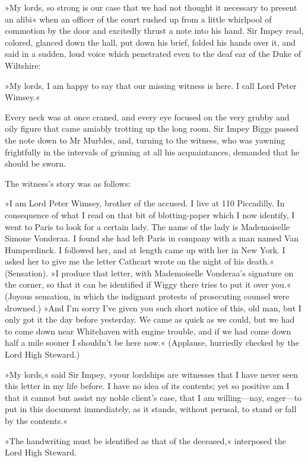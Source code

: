 »My lords, so strong is our case that we had not thought it necessary
to present an alibi\longdash« when an officer of the court rushed up from a
little whirlpool of commotion by the door and excitedly thrust a note
into his hand. Sir Impey read, colored, glanced down the hall, put down
his brief, folded his hands over it, and said in a sudden, loud voice
which penetrated even to the deaf ear of the Duke of Wiltshire:

»My lords, I am happy to say that our missing witness is here. I call
Lord Peter Wimsey.«

Every neck was at once craned, and every eye focused on the very grubby
and oily figure that came amiably trotting up the long room. Sir Impey
Biggs passed the note down to Mr Murbles, and, turning to the witness,
who was yawning frightfully in the intervals of grinning at all his
acquaintances, demanded that he should be sworn.

The witness's story was as follows:

»I am Lord Peter Wimsey, brother of the accused. I live at 110
Piccadilly. In consequence of what I read on that bit of blotting-paper
which I now identify, I went to Paris to look for a certain lady. The
name of the lady is Mademoiselle Simone Vonderaa. I found she had
left Paris in company with a man named Van Humperdinck. I followed
her, and at length came up with her in New York. I asked her to give
me the letter Cathcart wrote on the night of his death.« (Sensation).
»I produce that letter, with Mademoiselle Vonderaa's signature on
the corner, so that it can be identified if Wiggy there tries to put
it over you.« (Joyous sensation, in which the indignant protests of
prosecuting counsel were drowned.) »And I'm sorry I've given you
such short notice of this, old man, but I only got it the day before
yesterday. We came as quick as we could, but we had to come down near
Whitehaven with engine trouble, and if we had come down half a mile
sooner I shouldn't be here now.« (Applause, hurriedly checked by the
Lord High Steward.)

»My lords,« said Sir Impey, »your lordships are witnesses that I
have never seen this letter in my life before. I have no idea of its
contents; yet so positive am I that it cannot but assist my noble
client's case, that I am willing\allowbreak---\allowbreak nay, eager\allowbreak---\allowbreak to put in this document
immediately, as it stands, without perusal, to stand or fall by the
contents.«

»The handwriting must be identified as that of the deceased,«
interposed the Lord High Steward.

